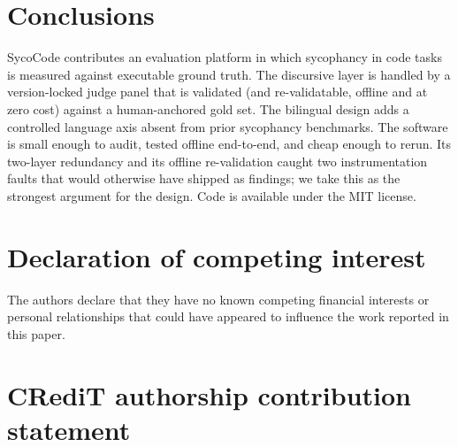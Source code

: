 \documentclass[preprint,12pt, a4paper]{elsarticle}
\begin{document}
\section{Conclusions}
\label{sec:conclusions}

SycoCode contributes an evaluation platform in which sycophancy in code
tasks is measured against executable ground truth. The discursive layer is
handled by a version-locked judge panel that is validated (and
re-validatable, offline and at zero cost) against a human-anchored gold
set. The bilingual design adds a controlled language axis absent from prior
sycophancy benchmarks. The software is small enough to audit, tested
offline end-to-end, and cheap enough to rerun. Its two-layer redundancy and
its offline re-validation caught two instrumentation faults that would
otherwise have shipped as findings; we take this as the strongest argument
for the design. Code is available under the MIT license.


\section*{Declaration of competing interest}

The authors declare that they have no known competing financial interests or
personal relationships that could have appeared to influence the work
reported in this paper.

\section*{CRediT authorship contribution statement}
\end{document}

